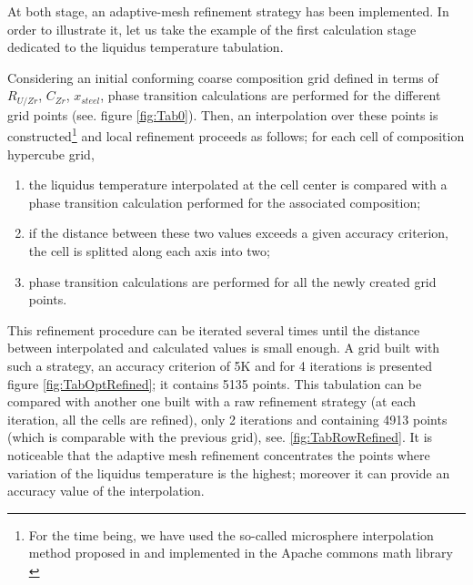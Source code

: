 \documentclass[11pt]{article}\usepackage{geometry} \geometry{letterpaper, margin=25.4mm}
\begin{document}
At both stage, an adaptive-mesh refinement strategy has been implemented. In order to illustrate it, let us take the example of the first calculation stage dedicated to the liquidus temperature tabulation. 

Considering an initial conforming coarse composition grid defined in terms of $R_{U/Zr}$, $C_{Zr}$, $x_{steel}$, phase transition calculations are performed for the different grid points (see. figure \ref{fig:Tab0}). Then, an interpolation over these points is constructed\footnote{For the time being, we have used the so-called microsphere interpolation method proposed in \cite{Dudziak2007} and implemented in the Apache commons math library \cite{Apache2016}} and local refinement proceeds as follows; for each cell of composition hypercube grid,
\begin{enumerate}
 \item the liquidus temperature interpolated at the cell center is compared with a phase transition calculation performed for the associated composition;
 \item if the distance between these two values exceeds a given accuracy criterion, the cell is splitted along each axis into two;
 \item phase transition calculations are performed for all the newly created grid points.
\end{enumerate}
This refinement procedure can be iterated several times until the distance between interpolated and calculated values is small enough. 
A grid built with such a strategy, an accuracy criterion of 5K and for 4 iterations is presented figure \ref{fig:TabOptRefined}; it contains 5135 points. This tabulation can be compared with another one built with a raw refinement strategy (at each iteration, all the cells are refined), only 2 iterations and containing 4913 points (which is comparable with the previous grid), see. \ref{fig:TabRowRefined}. It is noticeable that the adaptive mesh refinement concentrates the points where variation of the liquidus temperature is the highest; moreover it can provide an accuracy value of the interpolation. 
\end{document}
